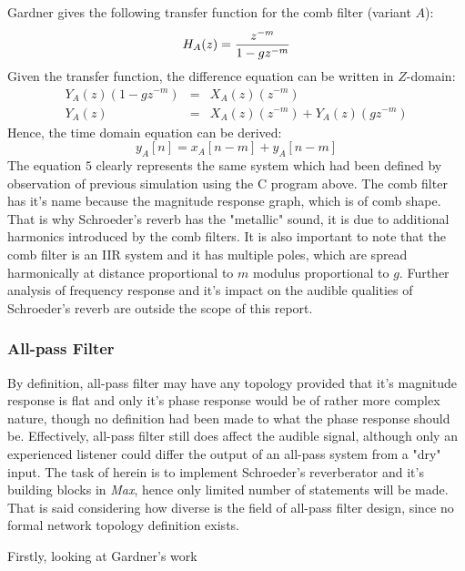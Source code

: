 \documentclass[12pt]{report}
\begin{document}
  

  Gardner \cite{gardner1998algorithms} gives the following transfer function
  for the comb filter (variant $A$):\begin{equation}
    H_A(z)={{z^{-m}}\over{1-gz^{-m}}}
  \end{equation}
  Given the transfer function, the difference equation can be written in
  $Z$-domain:\begin{eqnarray}
    Y_A(z)(1-gz^{-m}) &=& X_A(z)(z^{-m})\\
    Y_A(z) &=& X_A(z)(z^{-m}) + Y_A(z)(gz^{-m})
  \end{eqnarray}
  Hence, the time domain equation can be derived:
  \begin{equation}
    y_A[n] = x_A[n-m] + y_A[n-m]
  \end{equation}
  The equation $5$ clearly represents the same system which had been defined
  by observation of previous simulation using the C program above.
  The comb filter has it's name because the magnitude response graph, which is
  of comb shape. That is why Schroeder's reverb has the "metallic" sound, it
  is due to additional harmonics introduced by the comb filters. It is also
  important to note that the comb filter is an IIR system and it has multiple
  poles, which are spread harmonically at distance proportional to $m$ modulus
  proportional to $g$. Further analysis of frequency response and it's impact
  on the audible qualities of Schroeder's reverb are outside the scope of this
  report.

  \subsubsection{All-pass Filter}
  By definition, all-pass filter may have any topology provided that it's
  magnitude response is flat and only it's phase response would be of rather
  more complex nature, though no definition had been made to what the phase
  response should be. Effectively, all-pass filter still does affect the
  audible signal, although only an experienced listener could differ the
  output of an all-pass system from a "dry" input. The task of herein is to
  implement Schroeder's reverberator and it's building blocks in \emph{Max},
  hence only limited number of statements will be made. That is said
  considering how diverse is the field of all-pass filter design, since no
  formal network topology definition exists.

  Firstly, looking at Gardner's work \cite{gardner1998algorithms, gardner1992virtual}

  



%
%


\end{document}
